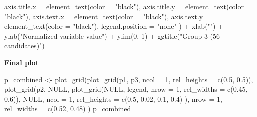 \documentclass[
  11pt,
  oneside]{book}
\newenvironment{Shaded}{\begin{snugshade}}{\end{snugshade}}
\newcommand{\AttributeTok}[1]{\textcolor[rgb]{0.77,0.63,0.00}{#1}}
\newcommand{\ConstantTok}[1]{\textcolor[rgb]{0.00,0.00,0.00}{#1}}
\newcommand{\DecValTok}[1]{\textcolor[rgb]{0.00,0.00,0.81}{#1}}
\newcommand{\FloatTok}[1]{\textcolor[rgb]{0.00,0.00,0.81}{#1}}
\newcommand{\FunctionTok}[1]{\textcolor[rgb]{0.00,0.00,0.00}{#1}}
\newcommand{\NormalTok}[1]{#1}
\newcommand{\OtherTok}[1]{\textcolor[rgb]{0.56,0.35,0.01}{#1}}
\newcommand{\SpecialCharTok}[1]{\textcolor[rgb]{0.00,0.00,0.00}{#1}}
\newcommand{\StringTok}[1]{\textcolor[rgb]{0.31,0.60,0.02}{#1}}
\begin{document}
\begin{Shaded}
\begin{Highlighting}[]
    \AttributeTok{axis.title.x =} \FunctionTok{element\_text}\NormalTok{(}\AttributeTok{color =} \StringTok{"black"}\NormalTok{),}
    \AttributeTok{axis.title.y =} \FunctionTok{element\_text}\NormalTok{(}\AttributeTok{color =} \StringTok{"black"}\NormalTok{),}
    \AttributeTok{axis.text.x =} \FunctionTok{element\_text}\NormalTok{(}\AttributeTok{color =} \StringTok{"black"}\NormalTok{),}
    \AttributeTok{axis.text.y =} \FunctionTok{element\_text}\NormalTok{(}\AttributeTok{color =} \StringTok{"black"}\NormalTok{),}
    \AttributeTok{legend.position =} \StringTok{"none"}
\NormalTok{  ) }\SpecialCharTok{+}
  \FunctionTok{xlab}\NormalTok{(}\StringTok{""}\NormalTok{) }\SpecialCharTok{+}
  \FunctionTok{ylab}\NormalTok{(}\StringTok{"Normalized variable value"}\NormalTok{) }\SpecialCharTok{+}
  \FunctionTok{ylim}\NormalTok{(}\DecValTok{0}\NormalTok{, }\DecValTok{1}\NormalTok{) }\SpecialCharTok{+}
  \FunctionTok{ggtitle}\NormalTok{(}\StringTok{"Group 3 (56 candidates)"}\NormalTok{)}
\end{Highlighting}
\end{Shaded}

\textbf{Final plot}

\begin{Shaded}
\begin{Highlighting}[]
\NormalTok{p\_combined }\OtherTok{\textless{}{-}} \FunctionTok{plot\_grid}\NormalTok{(}\FunctionTok{plot\_grid}\NormalTok{(p1, p3, }\AttributeTok{ncol =} \DecValTok{1}\NormalTok{, }\AttributeTok{rel\_heights =} \FunctionTok{c}\NormalTok{(}\FloatTok{0.5}\NormalTok{, }\FloatTok{0.5}\NormalTok{)),}
  \FunctionTok{plot\_grid}\NormalTok{(p2,}
    \ConstantTok{NULL}\NormalTok{,}
    \FunctionTok{plot\_grid}\NormalTok{(}\ConstantTok{NULL}\NormalTok{, legend, }\AttributeTok{nrow =} \DecValTok{1}\NormalTok{, }\AttributeTok{rel\_widths =} \FunctionTok{c}\NormalTok{(}\FloatTok{0.45}\NormalTok{, }\FloatTok{0.6}\NormalTok{)),}
    \ConstantTok{NULL}\NormalTok{,}
    \AttributeTok{ncol =} \DecValTok{1}\NormalTok{, }\AttributeTok{rel\_heights =} \FunctionTok{c}\NormalTok{(}\FloatTok{0.5}\NormalTok{, }\FloatTok{0.02}\NormalTok{, }\FloatTok{0.1}\NormalTok{, }\FloatTok{0.4}\NormalTok{)}
\NormalTok{  ),}
  \AttributeTok{nrow =} \DecValTok{1}\NormalTok{, }\AttributeTok{rel\_widths =} \FunctionTok{c}\NormalTok{(}\FloatTok{0.52}\NormalTok{, }\FloatTok{0.48}\NormalTok{)}
\NormalTok{)}
\NormalTok{p\_combined}
\end{Highlighting}
\end{Shaded}
\end{document}
